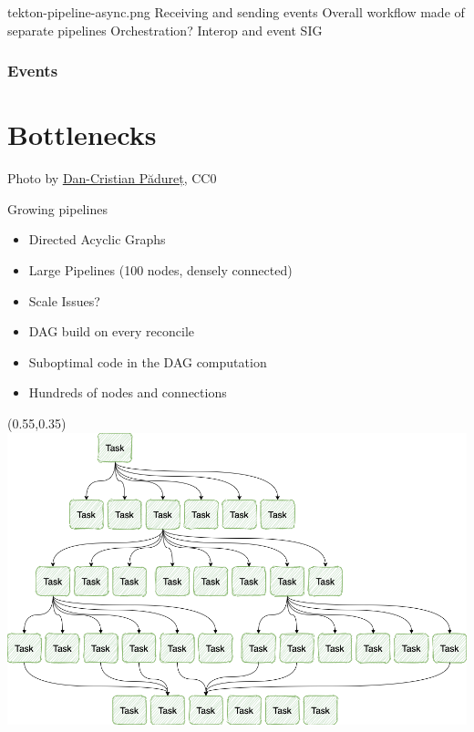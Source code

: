 \documentclass[aspectratio=169,11pt,hyperref={colorlinks=true}]{beamer}
\begin{document}
\begin{tpicstripedframe}%
  {tekton-pipeline-async.png}%
  {%
  Receiving and sending events
  }%
  {%
  Overall workflow made of separate pipelines
  }%
  {%
  Orchestration?
  }%
  {%
  Interop and event SIG
  }%
  \frametitle{Events}
\end{tpicstripedframe}

\section[Bottlenecks]{Bottlenecks}
\begin{sectionwithpicrx}{Photo by \href{https://unsplash.com/@dancristianp}{\underline{Dan-Cristian Pădureț}}, CC0}
\end{sectionwithpicrx}

{
\begin{tblackbgrayframe}{Growing pipelines}
  \begin{itemize}
    \item Directed Acyclic Graphs
    \item Large Pipelines (100 nodes, densely connected)
    \item Scale Issues?
  \end{itemize}
  \begin{itemize}
    \item DAG build on every reconcile
    \item Suboptimal code in the DAG computation
    \item Hundreds of nodes and connections
  \end{itemize}
  \begin{textblock*}{0.42\paperwidth}(0.55\paperwidth,0.35\paperheight)
    \includegraphics[width=0.42\paperwidth]{img/tekton-large-dag.png}
  \end{textblock*}
\end{tblackbgrayframe}
}
\end{document}
